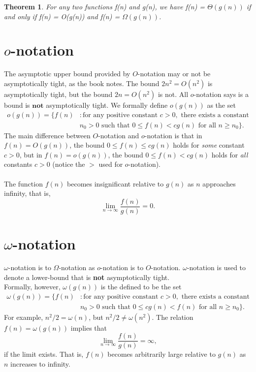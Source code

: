 \documentclass[12pt]{article}
\newtheorem{theorem}{Theorem}
\begin{document}
\begin{theorem}
For any two functions f(n) and g(n), we have f(n) = $\Theta{(g(n))}$ if and only if f(n) = O(g(n)) and f(n) = $\Omega{(g(n))}$.
\end{theorem}
\newpage


\section*{$o$-notation}
The asymptotic upper bound provided by $O$-notation may or not be asymptotically tight, as the book notes. The bound $2n^2=O(n^2)$ is asymptotically tight, but the bound $2n=O(n^2)$ is not. All $o$-notation says is a bound is $\textbf{not}$ asymptotically tight.\newline
We formally define $o(g(n))$ as the set
\begin{equation*}
\begin{split}
o{(g(n))} = \{f(n) & : \text{for any positive constant } c > 0,\text{ there exists a constant}\\
  & n_0 > 0 \text{ such that } 0 \leq f(n) < cg(n) \text{ for all } n \geq n_0\}.
\end{split}
\end{equation*}
The main difference between $O$-notation and $o$-notation is that in $f(n)=O(g(n))$, the bound $0 \leq f(n) \leq cg(n)$ holds for \textit{some} constant $c > 0$, but in $f(n)=o(g(n))$, the bound $0 \leq f(n) < cg(n)$ holds for \textit{all} constants $c > 0$ (notice the $>$ used for $o$-notation).
\\ \\
The function $f(n)$ becomes insignificant relative to $g(n)$ as $n$ approaches infinity, that is,
\newline
$$\lim_{n\to\infty} \frac{f(n)}{g(n)} = 0.$$


\section*{$\omega$-notation}
$\omega$-notation is to $\Omega$-notation as $o$-notation is to $O$-notation. $\omega$-notation is used to denote a lower-bound that is \textbf{not} asymptotically tight.\\
Formally, however, $\omega(g(n))$ is the defined to be the set\newline
\begin{equation*}
\begin{split}
\omega{(g(n))} = \{f(n) & : \text{for any positive constant } c > 0,\text{ there exists a constant}\\
  & n_0 > 0 \text{ such that } 0 \leq cg(n) < f(n) \text{ for all } n \geq n_0\}.
\end{split}
\end{equation*}
For example, $n^2/2 = \omega{(n)}$, but $n^2/2 \neq \omega{(n^2)}$. The relation $f(n) = \omega{(g(n))}$ implies that\newline
$$\lim_{n\to\infty} \frac{f(n)}{g(n)} = \infty,$$
if the limit exists. That is, $f(n)$ becomes arbitrarily large relative to $g(n)$ as $n$ increases to infinity.
\end{document}
